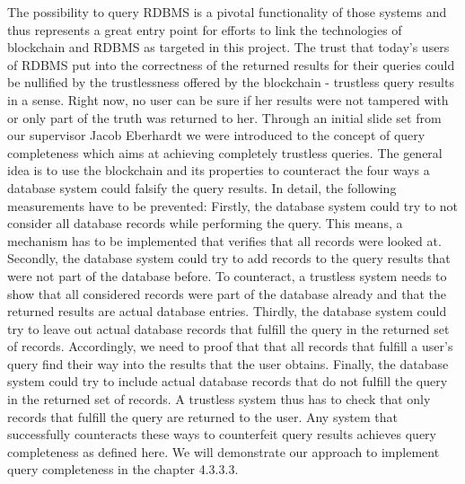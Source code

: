 The possibility to query RDBMS is a pivotal functionality of those systems and thus represents a great entry point for efforts to link the technologies of blockchain and RDBMS as targeted in this project. The trust that today’s users of RDBMS put into the correctness of the returned results for their queries could be nullified by the trustlessness offered by the blockchain - trustless query results in a sense. Right now, no user can be sure if her results were not tampered with or only part of the truth was returned to her.
Through an initial slide set from our supervisor Jacob Eberhardt we were introduced to the concept of query completeness which aims at achieving completely trustless queries. The general idea is to use the blockchain and its properties to counteract the four ways a database system could falsify the query results. In detail, the following measurements have to be prevented:
Firstly, the database system could try to not consider all database records while performing the query. This means, a mechanism has to be implemented that verifies that all records were looked at.
Secondly, the database system could try to add records to the query results that were not part of the database before. To counteract, a trustless system needs to show that all considered records were part of the database already and that the returned results are actual database entries.
Thirdly, the database system could try to leave out actual database records that fulfill the query in the returned set of records. Accordingly, we need to proof that that all records that fulfill a user’s query find their way into the results that the user obtains.
Finally, the database system could try to include actual database records that do not fulfill the query in the returned set of records. A trustless system thus has to check that only records that fulfill the query are returned to the user.
Any system that successfully counteracts these ways to counterfeit query results achieves query completeness as defined here. We will demonstrate our approach to implement query completeness in the chapter 4.3.3.3.


\newpage

